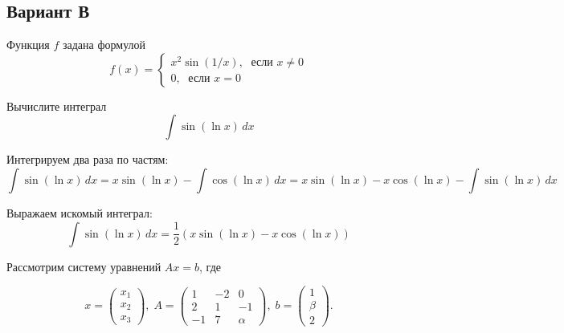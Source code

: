\documentclass[addpoints, answers]{exam} %
\begin{document}
\subsection{Вариант В}
\begin{questions}

\question Функция $f$ задана формулой
\[
f(x)=\begin{cases}
x^2\sin(1/x), \; \text{ если } x\neq 0 \\
0, \; \text{ если } x = 0
\end{cases}
\]

\question[10] Вычислите интеграл
\[
\int \sin( \ln x) \, dx
\]

\begin{solution}
Интегрируем два раза по частям:
\[
\int \sin( \ln x) \, dx = 	x \sin( \ln x)  - \int \cos( \ln x) \, dx = x \sin( \ln x)  -  x \cos( \ln x)  - \int \sin( \ln x) \, dx
\]


Выражаем искомый интеграл:
\[
\int \sin( \ln x) \, dx =\frac{1}{2}\left(  x \sin( \ln x)  -  x \cos( \ln x)  \right)
\]
\end{solution}


\question Рассмотрим систему уравнений $Ax=b$, где

\[
x=\begin{pmatrix}
x_1 \\
x_2 \\
x_3
\end{pmatrix}, \;
A=\begin{pmatrix}
1 & -2 & 0 \\
2 & 1 &  -1\\
-1 & 7 & \alpha
\end{pmatrix}, \;
b=\begin{pmatrix}
1 \\
\beta \\
2
\end{pmatrix}.
\]


\end{questions}
\end{document}
